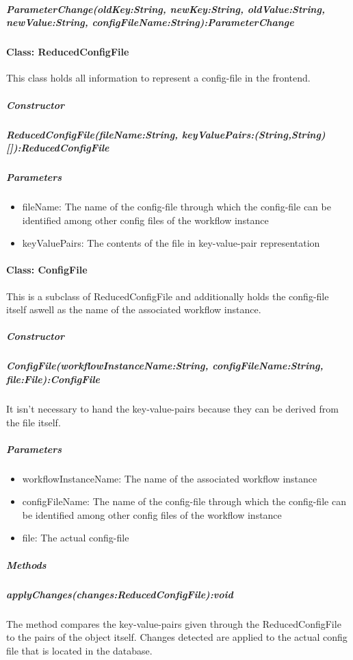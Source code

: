 \subparagraph{ParameterChange(oldKey:String, newKey:String, oldValue:String, newValue:String, configFileName:String):ParameterChange}


\paragraph{Class: ReducedConfigFile}
This class holds all information to represent a config-file in the frontend.
\subparagraph{Constructor}

\subparagraph{ReducedConfigFile(fileName:String, keyValuePairs:(String,String)[]):ReducedConfigFile}

\subparagraph{Parameters}
\begin{itemize}
	\item{fileName:}
	The name of the config-file through which the config-file can be identified among other config files of the workflow instance
	\item{keyValuePairs:}
	The contents of the file in key-value-pair representation
\end{itemize}


\paragraph{Class: ConfigFile}
This is a subclass of ReducedConfigFile and additionally holds the config-file itself aswell as the name of the associated workflow instance.
\subparagraph{Constructor}

\subparagraph{ConfigFile(workflowInstanceName:String, configFileName:String, file:File):ConfigFile}
It isn't necessary to hand the key-value-pairs because they can be derived from the file itself.

\subparagraph{Parameters}
\begin{itemize}
	\item{workflowInstanceName:}
	The name of the associated workflow instance
	\item{configFileName:}
	The name of the config-file through which the config-file can be identified among other config files of the workflow instance
	\item{file:}
	The actual config-file
\end{itemize}

\subparagraph{Methods}

\subparagraph{applyChanges(changes:ReducedConfigFile):void}
The method compares the key-value-pairs given through the ReducedConfigFile to the pairs of the object itself. Changes detected are applied to the actual config file that is located in the database.

